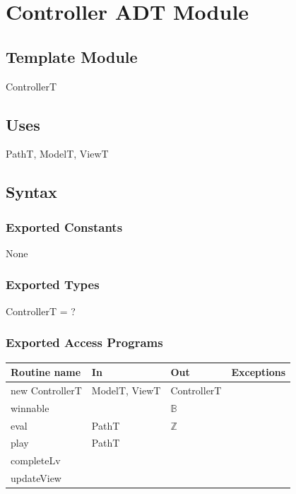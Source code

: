 \documentclass[12pt]{article}
\begin{document}
\newpage

\section* {Controller ADT Module}

\subsection*{Template Module}

ControllerT

\subsection* {Uses}

PathT, ModelT, ViewT

\subsection* {Syntax}

\subsubsection* {Exported Constants}

None

\subsubsection* {Exported Types}

ControllerT = ?

\subsubsection* {Exported Access Programs}

\begin{tabular}{| l | l | l | l |}
	\hline
	\textbf{Routine name} & \textbf{In} & \textbf{Out} & \textbf{Exceptions}\\
	\hline
	new ControllerT & ModelT, ViewT & ControllerT & ~\\
	\hline
	winnable & ~ & $\mathbb{B}$ & ~\\
	\hline
	eval & PathT & $\mathbb{Z}$ & ~\\
	\hline
	play & PathT & ~ & ~\\
	\hline
	completeLv & ~ & ~ & ~\\
	\hline
	updateView & ~ & ~ & ~\\
	\hline
	
\end{tabular}
\end{document}
